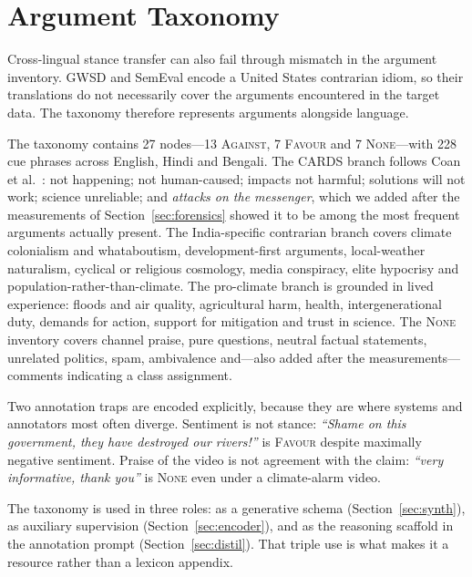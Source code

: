 \documentclass{ceurart}
\begin{document}
\section{Argument Taxonomy}
\label{sec:taxonomy}

Cross-lingual stance transfer can also fail through mismatch in the argument
inventory. GWSD and SemEval encode a United States contrarian idiom, so their
translations do not necessarily cover the arguments encountered in the
target data. The taxonomy therefore represents arguments alongside language.

The taxonomy contains 27 nodes---13 \textsc{Against}, 7 \textsc{Favour} and
7 \textsc{None}---with 228 cue phrases across English, Hindi and Bengali.
The CARDS branch follows Coan et al.~\cite{coan2021}: not happening; not
human-caused; impacts not harmful; solutions will not work; science
unreliable; and \emph{attacks on the messenger}, which we added after the
measurements of Section~\ref{sec:forensics} showed it to be among the most
frequent arguments actually present. The India-specific contrarian branch
covers climate colonialism and whataboutism, development-first arguments,
local-weather naturalism, cyclical or religious cosmology, media conspiracy,
elite hypocrisy and population-rather-than-climate. The pro-climate branch
is grounded in lived experience: floods and air quality, agricultural harm,
health, intergenerational duty, demands for action, support for mitigation
and trust in science. The \textsc{None} inventory covers channel praise,
pure questions, neutral factual statements, unrelated politics, spam,
ambivalence and---also added after the measurements---comments indicating a
class assignment.

Two annotation traps are encoded explicitly, because they are where systems
and annotators most often diverge. Sentiment is not stance: \emph{``Shame on
this government, they have destroyed our rivers!''} is \textsc{Favour}
despite maximally negative sentiment. Praise of the video is not agreement
with the claim: \emph{``very informative, thank you''} is \textsc{None} even
under a climate-alarm video.

The taxonomy is used in three roles: as a generative schema
(Section~\ref{sec:synth}), as auxiliary supervision
(Section~\ref{sec:encoder}), and as the reasoning scaffold in the annotation
prompt (Section~\ref{sec:distil}). That triple use is what makes it a
resource rather than a lexicon appendix.

\end{document}
